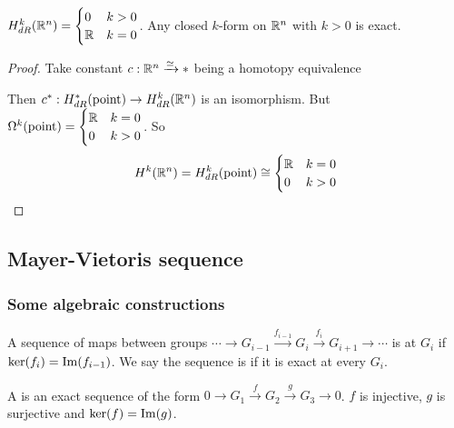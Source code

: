 
\tikzset{external/export=true}
\begin{corollary}\label{Poincare Lemma}
    $ H^k_{dR}(\mathbb R^n)=\displaystyle\begin{cases}
       0 &k>0\\
       \mathbb R &k=0
    \end{cases} $. \ie Any closed  $ k $-form on  $ \mathbb R^n $ with  $ k>0 $  is exact. 
\end{corollary}
\begin{proof}
   Take constant  $ c:\mathbb R^n\xrightarrow{\simeq} *$ being a homotopy equivalence

   Then  $ c^*:H^*_{dR}(\text{point})\rightarrow H_{dR}^k(\mathbb R^n) $ is an isomorphism. But  $ \Omega^k(\text{point})=\begin{cases}
       \mathbb R &k=0\\
       0 &k>0
   \end{cases}  $. So
   \begin{equation*}
       H^k(\mathbb R^n)=H^k_{dR}(\text{point})\cong\begin{cases}
           \mathbb R&k=0\\
           0&k>0
       \end{cases}
   \end{equation*} 
\end{proof}
\subsection{Mayer-Vietoris sequence}
\subsubsection{Some algebraic constructions}
A sequence of maps between groups  $ \cdots\rightarrow G_{i-1}\xrightarrow{f_{i-1}} G_i\xrightarrow{f_i} G_{i+1}\rightarrow\cdots $ is  at  $ G_i $  if  $ \ker(f_i)=\mathrm{Im}(f_{i-1}) $. 
We say the sequence is  if it is exact at every  $ G_i$.

A  is an exact sequence of the form  $ 0\rightarrow G_1\xrightarrow{f} G_2\xrightarrow{g} G_3\rightarrow 0 $. \ie  $ f  $ is injective,  $ g  $ is surjective and  $ \ker(f)=\mathrm{Im}(g) $.

